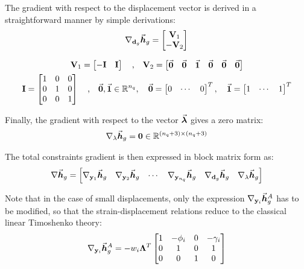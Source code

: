\begin{appendices}
\noindent The gradient with respect to the displacement vector is derived in a
straightforward manner by simple derivations:
\begin{gather}
	\nabla_{\mathbf{d}_g}\vec{\bm{h}}_g = \begin{bmatrix}
		\mathbf{V}_1 \\ -\mathbf{V}_2
	\end{bmatrix}
	\label{eq:congradisp}
\end{gather}

\begin{gather}
	\mathbf{V}_1 = \begin{bmatrix}
		-\mathbf{I} & \mathbf{I}
	\end{bmatrix}\quad\text{,}\quad
	\mathbf{V}_2 = \begin{bmatrix}
		\vec{\bm{0}} & \vec{\bm{0}} & \vec{\bm{1}} & \vec{\bm{0}} & \vec{\bm{0}} & \vec{\bm{0}}
	\end{bmatrix}\nonumber\\
	\mathbf{I} = \begin{bmatrix}
		1 & 0 & 0\\
		0 & 1 & 0\\
		0 & 0 & 1
	\end{bmatrix}\quad\text{,}\quad \vec{\bm{0}},\vec{\bm{1}}\in\mathbb{R}^{n_q},\quad 
	\vec{\bm{0}}=\begin{bmatrix}
		0 & \cdots & 0
	\end{bmatrix}^T,\quad \vec{\bm{1}}=\begin{bmatrix}
		1 & \cdots & 1
	\end{bmatrix}^T\nonumber
\end{gather}

\noindent Finally, the gradient with respect to the vector $\vec{\bm{\lambda}}$
gives a zero matrix:
\begin{gather}
	\nabla_{\mathbf{\lambda}}\vec{\bm{h}}_g = 
	\mathbf{0}\in\mathbb{R}^{(n_q+3)\times(n_q+3)}
\end{gather}

\noindent The total constraints gradient is then expressed in block matrix
form as:
\begin{gather}
	\nabla\vec{\bm{h}}_g = \begin{bmatrix}
		\nabla_{\mathbf{y}_1}\vec{\bm{h}}_g & \nabla_{\mathbf{y}_2}\vec{\bm{h}}_g &
		\cdots & \nabla_{\mathbf{y}_{n_q}}\vec{\bm{h}}_g & 
		\nabla_{\mathbf{d}_g}\vec{\bm{h}}_g &
		\nabla_{\mathbf{\lambda}}\vec{\bm{h}}_g
	\end{bmatrix}\nonumber
\end{gather}

\noindent Note that in the case of small displacements, only the
expression $\nabla_{\mathbf{y}_i}\vec{\bm{h}}_g^A$ has to be modified, so that
the strain-displacement relations reduce to the classical linear Timoshenko
theory:
\begin{gather}
	\nabla_{\mathbf{y}_i}\vec{\bm{h}}_g^A =-w_i\mathbf{\Lambda}^T\begin{bmatrix}
		1 & -\phi_i & 0 & -\gamma_i\\
		0 & 1 & 0 & 1\\
		0 & 0 & 1 & 0
	\end{bmatrix}\nonumber
\end{gather}


\end{appendices}
